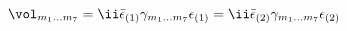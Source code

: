 \begin{equation}
   \vol_{m_1\dots m_7} 
      = \ii \bar{\epsilon}_{(1)}\gamma_{m_1\dots m_7}\epsilon_{(1)}
      = \ii \bar{\epsilon}_{(2)}\gamma_{m_1\dots m_7}\epsilon_{(2)}
\end{equation}

